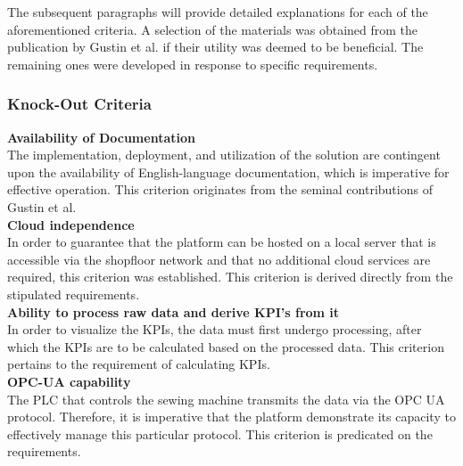The subsequent paragraphs will provide detailed explanations for each of the aforementioned criteria. A selection of the materials was obtained from the publication by Gustin et al. if their utility was deemed to be beneficial. The remaining ones were developed in response to specific requirements.

\subsubsection{Knock-Out Criteria}
\textbf{Availability of Documentation}\\
The implementation, deployment, and utilization of the solution are contingent upon the availability of English-language documentation, which is imperative for effective operation. This criterion originates from the seminal contributions of Gustin et al.\\
\textbf{Cloud independence}\\
In order to guarantee that the platform can be hosted on a local server that is accessible via the shopfloor network and that no additional cloud services are required, this criterion was established. This criterion is derived directly from the stipulated requirements.\\
\textbf{Ability to process raw data and derive KPI's from it}\\
In order to visualize the KPIs, the data must first undergo processing, after which the KPIs are to be calculated based on the processed data. This criterion pertains to the requirement of calculating KPIs. \\
\textbf{OPC-UA capability}\\
The PLC that controls the sewing machine transmits the data via the OPC UA protocol. Therefore, it is imperative that the platform demonstrate its capacity to effectively manage this particular protocol. This criterion is predicated on the requirements.

